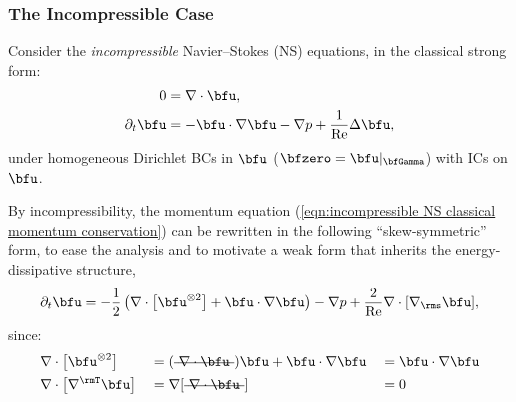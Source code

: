\subsubsection*{The Incompressible Case}
    Consider the \emph{incompressible} Navier--Stokes (NS) equations, in the classical strong form:
    \begin{align}
                       0  &=  \nabla\cdot\bfu,  \label{eqn:incompressible NS mass conservation}  \\
        \partial_{t}\bfu  &=  - \bfu\cdot\nabla\bfu - \nabla p + \frac{1}{\rmRe}\Delta\bfu,  \label{eqn:incompressible NS classical momentum conservation}
    \end{align}
    under homogeneous Dirichlet BCs in $\bfu$ ($\bfzero  =  \bfu|_{\bfGamma}$) with ICs on $\bfu$.

    By incompressibility, the momentum equation (\ref{eqn:incompressible NS classical momentum conservation}) can be rewritten in the following ``skew-symmetric'' form, to ease the analysis and to motivate a weak form that inherits the energy-dissipative structure,
    \begin{equation}\label{eqn:incompressible NS skew-symmetric momentum equation}
        \partial_{t}\bfu  =  - \frac{1}{2}\left(\nabla\cdot\left[\bfu^{\otimes 2}\right] + \bfu\cdot\nabla\bfu\right) - \nabla p + \frac{2}{\rmRe}\nabla\cdot[\nabla_{\rms}\bfu],
    \end{equation}
    since:
    \begin{align}
        &\nabla\cdot\left[\bfu^{\otimes 2}\right]  &&=  (\mst{\nabla\cdot\bfu})\bfu + \bfu\cdot\nabla\bfu  &&=  \bfu\cdot\nabla\bfu  \\
        &\nabla\cdot\left[\nabla^{\rmT}\bfu\right]  &&=  \nabla[\mst{\nabla\cdot\bfu}]  &&=  0
    \end{align}

    \begin{remark}
    \end{remark}
    

